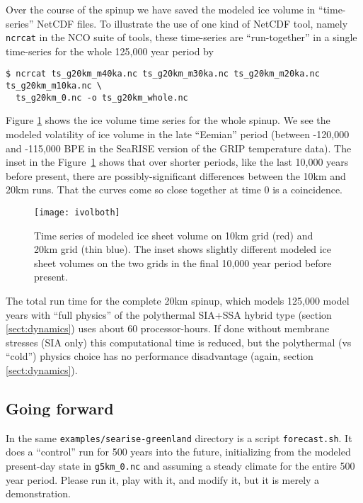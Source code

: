 Over the course of the spinup we have saved the modeled ice volume in ``time-series'' NetCDF files.  To illustrate the use of one kind of NetCDF tool, namely \verb|ncrcat| in the NCO suite of tools, these time-series are ``run-together'' in a single time-series for the whole 125,000 year period by
\begin{verbatim}
$ ncrcat ts_g20km_m40ka.nc ts_g20km_m30ka.nc ts_g20km_m20ka.nc ts_g20km_m10ka.nc \
  ts_g20km_0.nc -o ts_g20km_whole.nc
\end{verbatim}
\noindent Figure \ref{fig:sr-spindone-ivolboth} shows the ice volume time series for the whole spinup.  We see the modeled volatility of ice volume in the late ``Eemian'' period (between -120,000 and -115,000 BPE in the SeaRISE version of the GRIP temperature data).  The inset in the Figure~\ref{fig:sr-spindone-ivolboth} shows that over shorter periods, like the last 10,000 years before present, there are possibly-significant differences between the 10km and 20km runs.  That the curves come so close together at time 0 is a coincidence.

\begin{figure}[ht]
\centering
\texttt{[image: ivolboth]}
\caption{Time series of modeled ice sheet volume on 10km grid (red) and 20km grid (thin blue).  The inset shows slightly different modeled ice sheet volumes on the two grids in the final 10,000 year period before present.}
\label{fig:sr-spindone-ivolboth}
\end{figure}

The total run time for the complete 20km spinup, which models 125,000 model years with ``full physics'' of the polythermal SIA+SSA hybrid type (section \ref{sect:dynamics}) uses about 60 processor-hours.  If done without membrane stresses (SIA only) this computational time is reduced, but the polythermal (vs ``cold'') physics choice has no performance disadvantage (again, section \ref{sect:dynamics}).


\subsection{Going forward}  \label{subsect:forecastcaution}  In the same \verb|examples/searise-greenland| directory is a script \verb|forecast.sh|.  It does a ``control'' run for 500 years into the future, initializing from the modeled present-day state in \verb|g5km_0.nc| and assuming a steady climate for the entire 500 year period.  Please run it, play with it, and modify it, but it is merely a demonstration.

